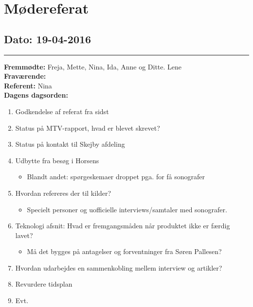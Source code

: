 \chapter{Mødereferat}

\section{Dato: 19-04-2016}
\hrule
\textbf{Fremmødte: } Freja, Mette, Nina, Ida, Anne og Ditte. Lene \\
\textbf{Fraværende:} \\
\textbf{Referent: } Nina \\
\textbf{Dagens dagsorden: }
\begin{enumerate}
	\item Godkendelse af referat fra sidst
\item Status på MTV-rapport, hvad er blevet skrevet?
\item Status på kontakt til Skejby afdeling
\item Udbytte fra besøg i Horsens
\begin{itemize}
\item Blandt andet: spørgeskemaer droppet pga. for få sonografer
\end{itemize}
\item  Hvordan refereres der til kilder?
\begin{itemize}
\item Specielt personer og uofficielle interviews/samtaler med sonografer.
\end{itemize}
\item Teknologi afsnit: Hvad er fremgangsmåden når produktet ikke er færdig lavet?
\begin{itemize}
\item Må det bygges på antagelser og forventninger fra Søren Pallesen?
\end{itemize}
\item Hvordan udarbejdes en sammenkobling mellem interview og artikler?
\item Revurdere tidsplan
\item Evt.
\end{enumerate}

